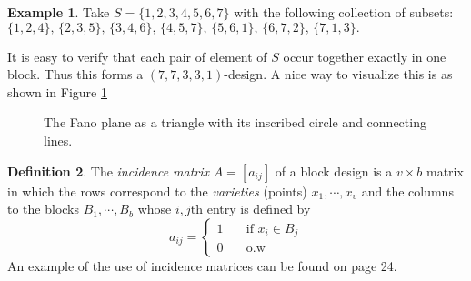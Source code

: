 \documentclass[11pt,a4paper]{article}
\theoremstyle{definition}
\newtheorem{definition}{Definition}[section]
\newtheorem{example}[definition]{Example}
\theoremstyle{plain}
\theoremstyle{remark}
\begin{document}
\begin{example}
    Take $S = \{1, 2,3,4,5,6,7\}$ with the following collection of subsets: $\{1,2,4\}, \, \{2,3,5\}, \, \{3,4,6\}, \, \{4, 5,7\}, \, \{5,6,1\}, \, \{6,7,2\}, \, \{7, 1,3\}.$

    It is easy to verify that each pair of element of $S$ occur together exactly in one block. Thus this forms a $(7, 7, 3, 3, 1)$-design. 
    A nice way to visualize this is as shown in Figure \ref{fig:Fano-plane}
\end{example}

\begin{figure}[H]
    \centering
    \caption{The Fano plane as a triangle with its inscribed circle and connecting lines.}
    \label{fig:Fano-plane}
\end{figure}

\begin{definition}
    The \emph{incidence matrix} $A = [a_{ij}]$ of a block design is a $v \times b$ matrix in which the rows correspond 
    to the \emph{varieties} (points) $x_1, \cdots, x_v$ and the columns to the blocks $B_1, \cdots, B_b$ whose $i, j$th entry is defined by 
    $$a_{ij} = \begin{cases}
        1 \quad &\text{if } x_i \in B_j \\
        0 \quad &\text{o.w}
    \end{cases}$$
    An example of the use of incidence matrices can be found on page 24. 
\end{definition}
\end{document}
